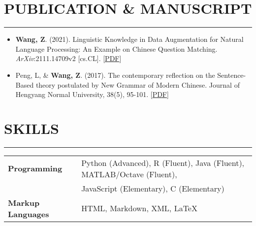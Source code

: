 \documentclass[a4paper, 11pt]{article}  %
\begin{document}
\section*{PUBLICATION \& MANUSCRIPT} %
\hrule 
\vspace{11pt}

\begin{itemize}
	\itemsep0em 
	
	\item{\textbf{Wang, Z}. (2021). Linguistic Knowledge in Data Augmentation for Natural Language Processing: An Example on Chinese Question Matching. \emph{ArXiv}:2111.14709v2 [cs.CL]. [\href{https://arxiv.org/pdf/2111.14709.pdf}{PDF}]}
	\item{Peng, L, \& \textbf{Wang, Z}. (2017). The contemporary reflection on the Sentence-Based theory postulated by New Grammar of Modern Chinese. Journal of Hengyang Normal University, 38(5), 95-101. [\href{https://www.researchgate.net/publication/340730935_The_contemporary_reflection_on_the_Sentence-Based_theory_postulated_by_New_Grammar_of_Modern_Chinese}{PDF}]}
	
\end{itemize}


\section*{SKILLS}
\hrule 
\vspace{11pt}

\begin{tabular}{@{} l l } %

 	\textbf{Programming}  & Python (Advanced), R (Fluent), Java (Fluent), MATLAB/Octave (Fluent), \\
	 	& JavaScript (Elementary), C (Elementary) \vspace{11pt} \\ 

 	\textbf{Markup Languages} & HTML, Markdown, XML, \LaTeX \vspace{11pt}  \\  

\end{tabular}

\end{document}
